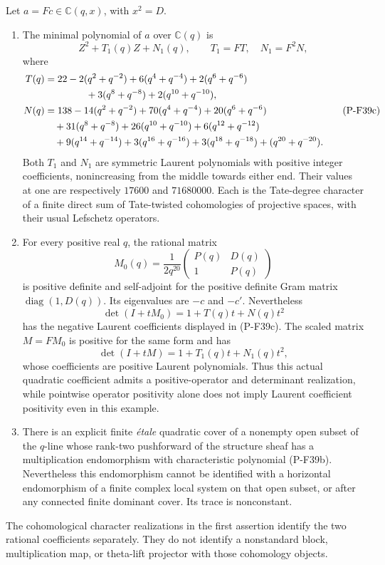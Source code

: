 \begin{proposition}
\label{prop:nonstandardtracenorm}
Let $a=Fc\in\mathbb C(q,x)$, with $x^2=D$.
\begin{enumerate}
\item The minimal polynomial of $a$ over $\mathbb C(q)$ is
\[
                   Z^2+T_1(q)Z+N_1(q),
 \qquad T_1=FT,\quad N_1=F^2N,
 \tag{P-F39b}
\]
where
\[
 \begin{split}
 T(q)&=22-2(q^2+q^{-2})+6(q^4+q^{-4})
       +2(q^6+q^{-6})\\
     &\hspace{15mm}+3(q^8+q^{-8})+2(q^{10}+q^{-10}),\\
 N(q)&=138-14(q^2+q^{-2})+70(q^4+q^{-4})
      +20(q^6+q^{-6})\\
     &\quad+31(q^8+q^{-8})+26(q^{10}+q^{-10})
      +6(q^{12}+q^{-12})\\
     &\quad+9(q^{14}+q^{-14})+3(q^{16}+q^{-16})
      +3(q^{18}+q^{-18})+(q^{20}+q^{-20}).
 \end{split}
 \tag{P-F39c}
\]
Both $T_1$ and $N_1$ are symmetric Laurent polynomials with positive
integer coefficients, nonincreasing from the middle towards either
end. Their values at one are respectively $17600$ and $71680000$.
Each is the Tate-degree character of a finite direct sum of
Tate-twisted cohomologies of projective spaces, with their usual
Lefschetz operators.
\item For every positive real $q$, the rational matrix
\[
 M_0(q)=\frac1{2q^{20}}
          \begin{pmatrix}P(q)&D(q)\\1&P(q)\end{pmatrix}
 \tag{P-F39k}
\]
is positive definite and self-adjoint for the positive definite
Gram matrix $\operatorname{diag}(1,D(q))$. Its eigenvalues
are $-c$ and $-c'$. Nevertheless
\[
       \det(I+tM_0)=1+T(q)t+N(q)t^2
 \tag{P-F39l}
\]
has the negative Laurent coefficients displayed in (P-F39c).
The scaled matrix $M=FM_0$ is positive for the same form and has
\[
       \det(I+tM)=1+T_1(q)t+N_1(q)t^2,
 \tag{P-F39m}
\]
whose coefficients are positive Laurent polynomials.
Thus this actual quadratic coefficient admits a positive-operator
and determinant realization, while pointwise operator positivity
alone does not imply Laurent coefficient positivity even in this
example.
\item There is an explicit finite \emph{\'{e}tale} quadratic cover
of a nonempty open subset of the $q$-line whose rank-two pushforward
of the structure sheaf has a multiplication endomorphism with
characteristic polynomial (P-F39b). Nevertheless this endomorphism
cannot be identified with a horizontal endomorphism of a finite
complex local system on that open subset, or after any connected
finite dominant cover. Its trace is nonconstant.
\end{enumerate}
The cohomological character realizations in the first assertion
identify the two rational coefficients separately. They do not
identify a nonstandard block, multiplication map, or theta-lift
projector with those cohomology objects.
\end{proposition}

